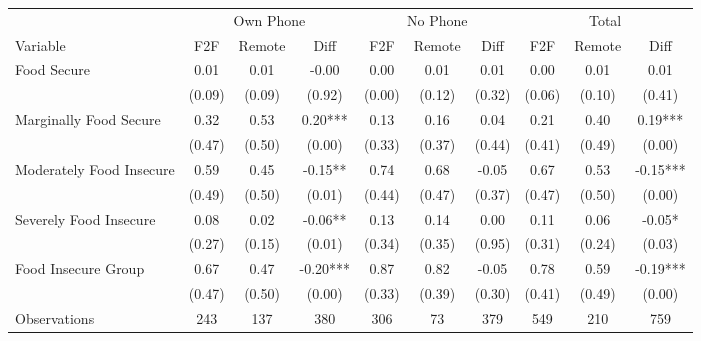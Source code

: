 \begin{tabular}{l*{9}c}
\hline\hline
 & \multicolumn{3}{c}{Own Phone} & \multicolumn{3}{c}{No Phone} & \multicolumn{3}{c}{Total}\\ 
Variable & F2F & Remote & Diff & F2F & Remote & Diff & F2F & Remote & Diff \\
\hline
Food Secure&0.01&0.01&-0.00&0.00&0.01&0.01&0.00&0.01&0.01\\
&(0.09)&(0.09)&(0.92)&(0.00)&(0.12)&(0.32)&(0.06)&(0.10)&(0.41)\\
Marginally Food Secure&0.32&0.53&0.20***&0.13&0.16&0.04&0.21&0.40&0.19***\\
&(0.47)&(0.50)&(0.00)&(0.33)&(0.37)&(0.44)&(0.41)&(0.49)&(0.00)\\
Moderately Food Insecure&0.59&0.45&-0.15**&0.74&0.68&-0.05&0.67&0.53&-0.15***\\
&(0.49)&(0.50)&(0.01)&(0.44)&(0.47)&(0.37)&(0.47)&(0.50)&(0.00)\\
Severely Food Insecure&0.08&0.02&-0.06**&0.13&0.14&0.00&0.11&0.06&-0.05*\\
&(0.27)&(0.15)&(0.01)&(0.34)&(0.35)&(0.95)&(0.31)&(0.24)&(0.03)\\
Food Insecure Group&0.67&0.47&-0.20***&0.87&0.82&-0.05&0.78&0.59&-0.19***\\
&(0.47)&(0.50)&(0.00)&(0.33)&(0.39)&(0.30)&(0.41)&(0.49)&(0.00)\\
\hline
Observations & 243 & 137 & 380 & 306 & 73 & 379 & 549 & 210 & 759 \\
\hline\hline
\end{tabular}
